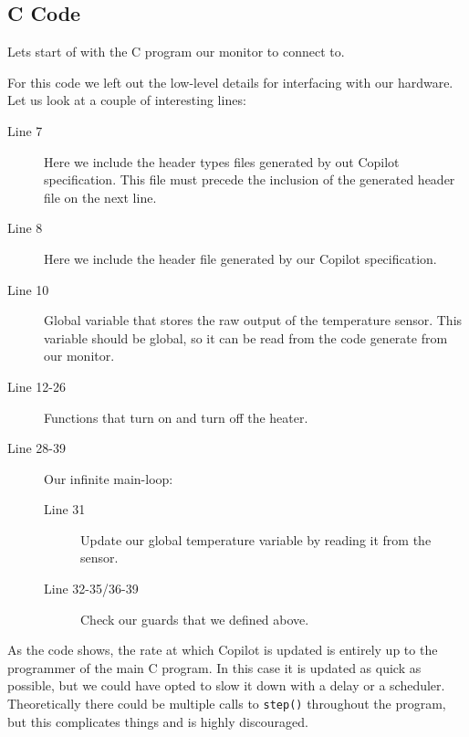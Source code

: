 \subsection{C Code}
Lets start of with the C program our monitor to connect to.


%
%
%
%
%
%
%

For this code we left out the low-level details for interfacing with our
hardware. Let us look at a couple of interesting lines:

\begin{description}
  \item[Line 7] Here we include the header types files generated by out Copilot
  specification. This file must precede the inclusion of the generated header
  file on the next line. 
  \item[Line 8] Here we include the header file generated by our Copilot
  specification.
  \item[Line 10] Global variable that stores the raw output of the temperature
  sensor. This variable should be global, so it can be read from the code
  generate from our monitor.
  \item[Line 12-26] Functions that turn on and turn off the
  heater.
  \item[Line 28-39] Our infinite main-loop:
    \begin{description}
      \item[Line 31] Update our global temperature variable by reading it from
      the sensor.
      \item[Line 32-35/36-39] Check our guards that we defined above.
    \end{description}
\end{description}

As the code shows, the rate at which Copilot is updated is entirely up to the
programmer of the main C program. In this case it is updated as quick as
possible, but we could have opted to slow it down with a delay or a scheduler.
Theoretically there could be multiple calls to \texttt{step()} throughout the
program, but this complicates things and is highly discouraged.


